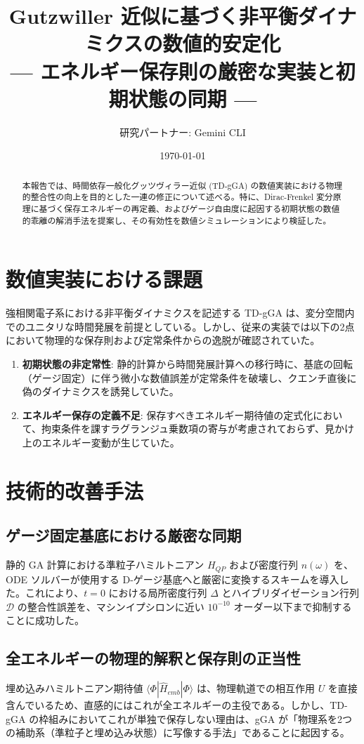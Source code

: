 \documentclass[a4paper,11pt]{ltjarticle}
\title{Gutzwiller 近似に基づく非平衡ダイナミクスの数値的安定化\\ --- エネルギー保存則の厳密な実装と初期状態の同期 ---}
\author{研究パートナー: Gemini CLI}
\date{\today}
\begin{document}
\maketitle

\begin{abstract}
本報告では、時間依存一般化グッツヴィラー近似 (TD-gGA) の数値実装における物理的整合性の向上を目的とした一連の修正について述べる。特に、Dirac-Frenkel 変分原理に基づく保存エネルギーの再定義、およびゲージ自由度に起因する初期状態の数値的乖離の解消手法を提案し、その有効性を数値シミュレーションにより検証した。
\end{abstract}

\section{数値実装における課題}
強相関電子系における非平衡ダイナミクスを記述する TD-gGA は、変分空間内でのユニタリな時間発展を前提としている。しかし、従来の実装では以下の2点において物理的な保存則および定常条件からの逸脱が確認されていた。
\begin{enumerate}
    \item \textbf{初期状態の非定常性}: 静的計算から時間発展計算への移行時に、基底の回転（ゲージ固定）に伴う微小な数値誤差が定常条件を破壊し、クエンチ直後に偽のダイナミクスを誘発していた。
    \item \textbf{エネルギー保存の定義不足}: 保存すべきエネルギー期待値の定式化において、拘束条件を課すラグランジュ乗数項の寄与が考慮されておらず、見かけ上のエネルギー変動が生じていた。
\end{enumerate}

\section{技術的改善手法}

\subsection{ゲージ固定基底における厳密な同期}
静的 GA 計算における準粒子ハミルトニアン $H_{QP}$ および密度行列 $n(\omega)$ を、ODE ソルバーが使用する D-ゲージ基底へと厳密に変換するスキームを導入した。これにより、$t=0$ における局所密度行列 $\Delta$ とハイブリダイゼーション行列 $\mathcal{D}$ の整合性誤差を、マシンイプシロンに近い $10^{-10}$ オーダー以下まで抑制することに成功した。

\subsection{全エネルギーの物理的解釈と保存則の正当性}
埋め込みハミルトニアン期待値 $\langle \Phi | \hat{H}_{emb} | \Phi \rangle$ は、物理軌道での相互作用 $U$ を直接含んでいるため、直感的にはこれが全エネルギーの主役である。しかし、TD-gGA の枠組みにおいてこれが単独で保存しない理由は、gGA が「物理系を2つの補助系（準粒子と埋め込み状態）に写像する手法」であることに起因する。
\end{document}
